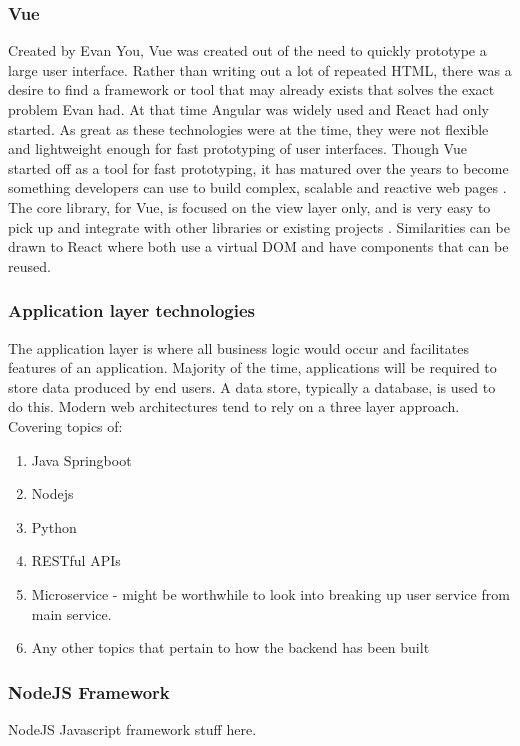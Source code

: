 \subsubsection*{Vue}
Created by Evan You, Vue was created out of the need to quickly prototype a large user interface.
Rather than writing out a lot of repeated HTML, there was a desire to find a framework or tool that may already exists that solves the exact problem Evan had.
At that time Angular was widely used and React had only started. As great as these technologies were at the time, they were not flexible and lightweight
enough for fast prototyping of user interfaces. Though Vue started off as a tool for fast prototyping, it has matured over the
years to become something developers can use to build complex, scalable and reactive web pages \cite{filipova2016learning}.
The core library, for Vue, is focused on the view layer only, and is very easy to pick up and integrate with other libraries or existing projects \cite{koetsier2016evaluation}.
Similarities can be drawn to React where both use a virtual DOM and have components that can be reused.


\subsubsection{Application layer technologies}
The application layer is where all business logic would occur and facilitates features of an application.
Majority of the time, applications will be required to store data produced by end users. A data store, typically a database, is
used to do this.
Modern web architectures tend to rely on a three layer approach. 
Covering topics of:
\begin{enumerate}
    \item Java Springboot
    \item Nodejs
    \item Python
    \item RESTful APIs
    \item Microservice - might be worthwhile to look into breaking up user service from main service.
    \item Any other topics that pertain to how the backend has been built
\end{enumerate}

\subsubsection*{NodeJS Framework}
NodeJS Javascript framework stuff here.

